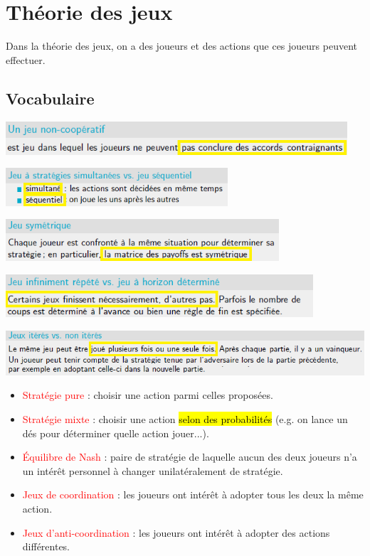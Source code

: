\documentclass[a4paper, 12pt]{article}
\newcommand{\alinea}{
\hspace*{0.5cm}}
\newcommand{\red}[1]{
	\textcolor{red}{#1}}
\begin{document}
\section{Théorie des jeux}
	\alinea Dans la théorie des jeux, on a des joueurs et des actions que ces joueurs peuvent effectuer.
	\subsection{Vocabulaire}
		\begin{center}
			\includegraphics[width=5in]{Images/cooperatif}
		\end{center}
		\begin{center}
			\includegraphics[width=3.25in]{Images/simultane_sequentiel}
		\end{center}
		\begin{center}
			\includegraphics[width=4in]{Images/symetrique}
		\end{center}
		\begin{center}
			\includegraphics[width=4.5in]{Images/repete}
		\end{center}
		\begin{center}
			\includegraphics[width=6in]{Images/itere}
		\end{center}
		\begin{itemize}
			\setlength\itemsep{0cm}
			\item \red{Stratégie pure} : choisir une action parmi celles proposées.
			\item \red{Stratégie mixte} : choisir une action \hl{selon des probabilités} (e.g. on lance un dés pour déterminer quelle 
				action jouer...).
			\item \red{\'Equilibre de Nash} : paire de stratégie de laquelle aucun des deux joueurs n'a un intérêt personnel à changer
				unilatéralement de stratégie.
			\item \red{Jeux de coordination} : les joueurs ont intérêt à adopter tous les deux la même action.
			\item \red{Jeux d'anti-coordination} : les joueurs ont intérêt à adopter des actions différentes.
		\end{itemize}
\end{document}
